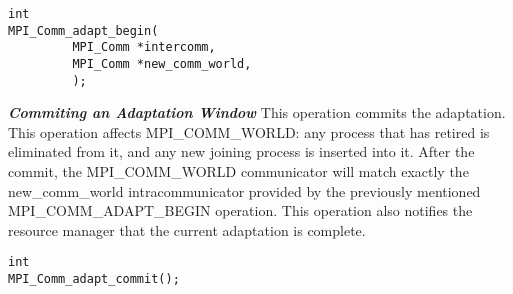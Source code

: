 \begin{lstlisting}[frame=single]
int
MPI_Comm_adapt_begin( 
         MPI_Comm *intercomm,
         MPI_Comm *new_comm_world,
         );
\end{lstlisting}
\textbf{\textit{Commiting an Adaptation Window}} This operation commits the adaptation. This operation affects MPI{\_}COMM{\_}WORLD: any process that has retired is eliminated from it, and any new joining process is inserted into it. After the commit, the MPI{\_}COMM{\_}WORLD communicator will match exactly the new{\_}comm{\_}world intracommunicator provided by the previously mentioned MPI{\_}COMM{\_}ADAPT{\_}BEGIN operation. This operation also notifies the resource manager that the current adaptation is complete.
\begin{lstlisting}[frame=single]
int
MPI_Comm_adapt_commit(); 
\end{lstlisting}
